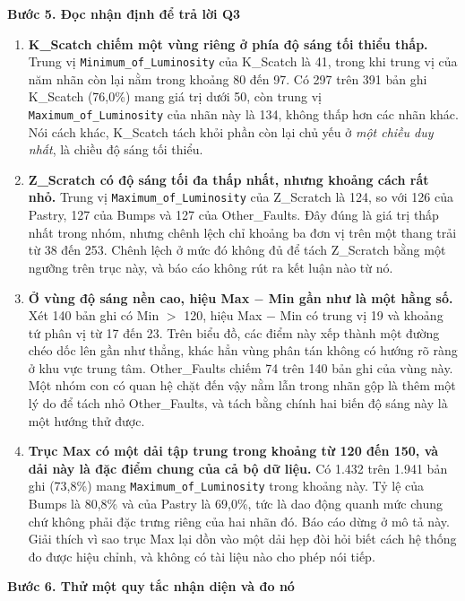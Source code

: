 \documentclass[12pt]{article}
\begin{document}
\noindent
\textbf{Bước 5. Đọc nhận định để trả lời Q3}

\begin{enumerate}
  \item \textbf{K\_Scatch chiếm một vùng riêng ở phía độ sáng tối thiểu thấp.} Trung vị \texttt{Minimum\_of\_Luminosity} của K\_Scatch là 41, trong khi trung vị của năm nhãn còn lại nằm trong khoảng 80 đến 97. Có 297 trên 391 bản ghi K\_Scatch (76,0\%) mang giá trị dưới 50, còn trung vị \texttt{Maximum\_of\_Luminosity} của nhãn này là 134, không thấp hơn các nhãn khác. Nói cách khác, K\_Scatch tách khỏi phần còn lại chủ yếu ở \emph{một chiều duy nhất}, là chiều độ sáng tối thiểu.

  \item \textbf{Z\_Scratch có độ sáng tối đa thấp nhất, nhưng khoảng cách rất nhỏ.} Trung vị \texttt{Maximum\_of\_Luminosity} của Z\_Scratch là 124, so với 126 của Pastry, 127 của Bumps và 127 của Other\_Faults. Đây đúng là giá trị thấp nhất trong nhóm, nhưng chênh lệch chỉ khoảng ba đơn vị trên một thang trải từ 38 đến 253. Chênh lệch ở mức đó không đủ để tách Z\_Scratch bằng một ngưỡng trên trục này, và báo cáo không rút ra kết luận nào từ nó.

  \item \textbf{Ở vùng độ sáng nền cao, hiệu Max $-$ Min gần như là một hằng số.} Xét 140 bản ghi có Min $>$ 120, hiệu Max $-$ Min có trung vị 19 và khoảng tứ phân vị từ 17 đến 23. Trên biểu đồ, các điểm này xếp thành một đường chéo dốc lên gần như thẳng, khác hẳn vùng phân tán không có hướng rõ ràng ở khu vực trung tâm. Other\_Faults chiếm 74 trên 140 bản ghi của vùng này. Một nhóm con có quan hệ chặt đến vậy nằm lẫn trong nhãn gộp là thêm một lý do để tách nhỏ Other\_Faults, và tách bằng chính hai biến độ sáng này là một hướng thử được.

  \item \textbf{Trục Max có một dải tập trung trong khoảng từ 120 đến 150, và dải này là đặc điểm chung của cả bộ dữ liệu.} Có 1.432 trên 1.941 bản ghi (73,8\%) mang \texttt{Maximum\_of\_Luminosity} trong khoảng này. Tỷ lệ của Bumps là 80,8\% và của Pastry là 69,0\%, tức là dao động quanh mức chung chứ không phải đặc trưng riêng của hai nhãn đó. Báo cáo dừng ở mô tả này. Giải thích vì sao trục Max lại dồn vào một dải hẹp đòi hỏi biết cách hệ thống đo được hiệu chỉnh, và không có tài liệu nào cho phép nói tiếp.

\end{enumerate}

\noindent
\textbf{Bước 6. Thử một quy tắc nhận diện và đo nó}
\end{document}
